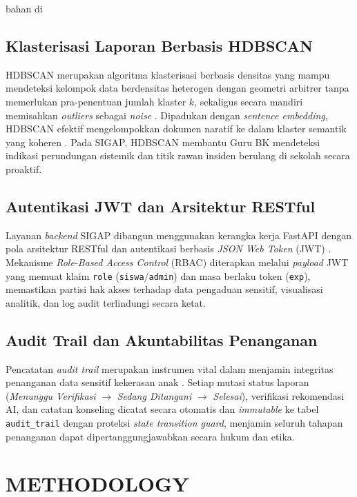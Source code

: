 bahan di\documentclass[conference]{IEEEtran}
\begin{document}
\subsection{Klasterisasi Laporan Berbasis HDBSCAN}
HDBSCAN merupakan algoritma klasterisasi berbasis densitas yang mampu mendeteksi kelompok data berdensitas heterogen dengan geometri arbitrer tanpa memerlukan pra-penentuan jumlah klaster $k$, sekaligus secara mandiri memisahkan \textit{outliers} sebagai \textit{noise} \cite{malzer2020}. Dipadukan dengan \textit{sentence embedding}, HDBSCAN efektif mengelompokkan dokumen naratif ke dalam klaster semantik yang koheren \cite{grootendorst2022}. Pada SIGAP, HDBSCAN membantu Guru BK mendeteksi indikasi perundungan sistemik dan titik rawan insiden berulang di sekolah secara proaktif.

\subsection{Autentikasi JWT dan Arsitektur RESTful}
Layanan \textit{backend} SIGAP dibangun menggunakan kerangka kerja FastAPI dengan pola arsitektur RESTful dan autentikasi berbasis \textit{JSON Web Token} (JWT) \cite{chakravarthy2019}. Mekanisme \textit{Role-Based Access Control} (RBAC) diterapkan melalui \textit{payload} JWT yang memuat klaim \texttt{role} (\texttt{siswa}/\texttt{admin}) dan masa berlaku token (\texttt{exp}), memastikan partisi hak akses terhadap data pengaduan sensitif, visualisasi analitik, dan log audit terlindungi secara ketat.

\subsection{Audit Trail dan Akuntabilitas Penanganan}
Pencatatan \textit{audit trail} merupakan instrumen vital dalam menjamin integritas penanganan data sensitif kekerasan anak \cite{regueiro2021}. Setiap mutasi status laporan (\textit{Menunggu Verifikasi} $\rightarrow$ \textit{Sedang Ditangani} $\rightarrow$ \textit{Selesai}), verifikasi rekomendasi AI, dan catatan konseling dicatat secara otomatis dan \textit{immutable} ke tabel \texttt{audit\_trail} dengan proteksi \textit{state transition guard}, menjamin seluruh tahapan penanganan dapat dipertanggungjawabkan secara hukum dan etika.

\section{METHODOLOGY}
\end{document}
